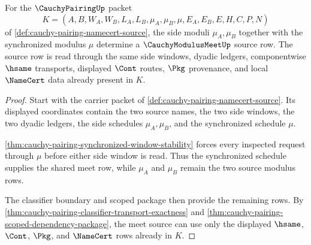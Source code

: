 \begin{theorem}
\label{thm:cauchy-pairing-meet-source}
For the $\CauchyPairingUp$ packet
$$
K=(A,B,W_A,W_B,L_A,L_B,\mu_A,\mu_B,\mu,E_A,E_B,E,H,C,P,N)
$$
of \autoref{def:cauchy-pairing-namecert-source}, the side moduli $\mu_A,\mu_B$ together with the synchronized modulus $\mu$ determine a $\CauchyModulusMeetUp$ source row. The source row is read through the same side windows, dyadic ledgers, componentwise $\hsame$ transports, displayed $\Cont$ routes, $\Pkg$ provenance, and local $\NameCert$ data already present in $K$.
\end{theorem}
\begin{proof}
Start with the carrier packet of \autoref{def:cauchy-pairing-namecert-source}. Its displayed coordinates contain the two source names, the two side windows, the two dyadic ledgers, the side schedules $\mu_A,\mu_B$, and the synchronized schedule $\mu$.

\autoref{thm:cauchy-pairing-synchronized-window-stability} forces every inspected request through $\mu$ before either side window is read. Thus the synchronized schedule supplies the shared meet row, while $\mu_A$ and $\mu_B$ remain the two source modulus rows.

The classifier boundary and scoped package then provide the remaining rows. By \autoref{thm:cauchy-pairing-classifier-transport-exactness} and \autoref{thm:cauchy-pairing-scoped-dependency-package}, the meet source can use only the displayed $\hsame$, $\Cont$, $\Pkg$, and $\NameCert$ rows already in $K$.
\end{proof}

